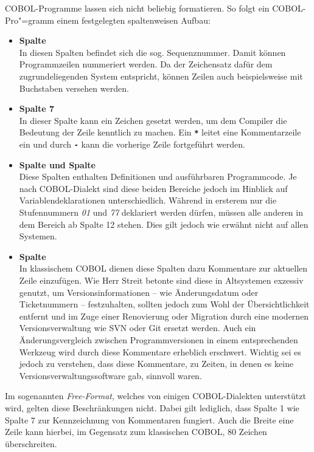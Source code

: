 COBOL-Programme lassen sich nicht beliebig formatieren. So folgt ein COBOL-Pro"=gramm einem festgelegten spaltenweisen Aufbau:
\begin{itemize}
    \item \textbf{Spalte }\\
    In diesen Spalten befindet sich die sog. Sequenznummer. Damit können Programmzeilen nummeriert werden. Da der Zeichensatz dafür dem zugrundeliegenden System entspricht, können Zeilen auch beispielsweise mit Buchstaben versehen werden.
    \item \textbf{Spalte 7}\\
    In dieser Spalte kann ein Zeichen gesetzt werden, um dem Compiler die Bedeutung der Zeile kenntlich zu machen. Ein {\tt\textbf{*}} leitet \zB eine Kommentarzeile ein und durch {\tt\textbf{-}} kann die vorherige Zeile fortgeführt werden.
    \item \textbf{Spalte  und Spalte }\\
    Diese Spalten enthalten Definitionen und ausführbaren Programmcode. Je nach COBOL-Dialekt sind diese beiden Bereiche jedoch im Hinblick auf Variablendeklarationen unterschiedlich. Während in ersterem nur die Stufennummern \textit{01} und \textit{77} deklariert werden dürfen, müssen alle anderen in dem Bereich ab Spalte 12 stehen. Dies gilt jedoch wie erwähnt nicht auf allen Systemen.
    \item \textbf{Spalte }\\
    In klassischem COBOL dienen diese Spalten dazu Kommentare zur aktuellen Zeile einzufügen. Wie Herr Streit betonte sind diese in Altsystemen exzessiv genutzt, um Versionsinformationen -- wie Änderungsdatum oder Ticketnummern -- festzuhalten, sollten jedoch zum Wohl der Übersichtlichkeit entfernt und im Zuge einer Renovierung oder Migration durch eine modernen Versionsverwaltung wie \zB SVN oder Git ersetzt werden. Auch ein Änderungsvergleich zwischen Programmversionen in einem entsprechenden Werkzeug wird durch diese Kommentare erheblich erschwert. Wichtig sei es jedoch zu verstehen, dass diese Kommentare, zu Zeiten, in denen es keine Versionsverwaltungssoftware gab, sinnvoll waren.
\end{itemize}

Im sogenannten \textit{Free-Format}, welches von einigen COBOL-Dialekten unterstützt wird, gelten diese Beschränkungen nicht. Dabei gilt lediglich, dass Spalte 1 wie Spalte 7 zur Kennzeichnung von Kommentaren fungiert. Auch die Breite eine Zeile kann hierbei, im Gegensatz zum klassischen COBOL, 80 Zeichen überschreiten. 